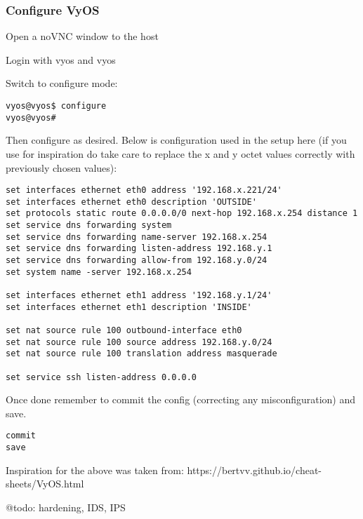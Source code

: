 \hypertarget{configure-vyos}{%
\subsubsection{Configure VyOS}\label{configure-vyos}}

Open a noVNC window to the host

Login with vyos and vyos

Switch to configure mode:

\begin{verbatim}
vyos@vyos$ configure
vyos@vyos#
\end{verbatim}

Then configure as desired. Below is configuration used in the setup here
(if you use for inspiration do take care to replace the x and y octet
values correctly with previously chosen values):

\begin{verbatim}
set interfaces ethernet eth0 address '192.168.x.221/24'
set interfaces ethernet eth0 description 'OUTSIDE'
set protocols static route 0.0.0.0/0 next-hop 192.168.x.254 distance 1
set service dns forwarding system
set service dns forwarding name-server 192.168.x.254
set service dns forwarding listen-address 192.168.y.1
set service dns forwarding allow-from 192.168.y.0/24
set system name -server 192.168.x.254

set interfaces ethernet eth1 address '192.168.y.1/24'
set interfaces ethernet eth1 description 'INSIDE'

set nat source rule 100 outbound-interface eth0
set nat source rule 100 source address 192.168.y.0/24
set nat source rule 100 translation address masquerade

set service ssh listen-address 0.0.0.0
\end{verbatim}

Once done remember to commit the config (correcting any
misconfiguration) and save.

\begin{verbatim}
commit
save
\end{verbatim}

Inspiration for the above was taken from:
https://bertvv.github.io/cheat-sheets/VyOS.html

@todo: hardening, IDS, IPS
